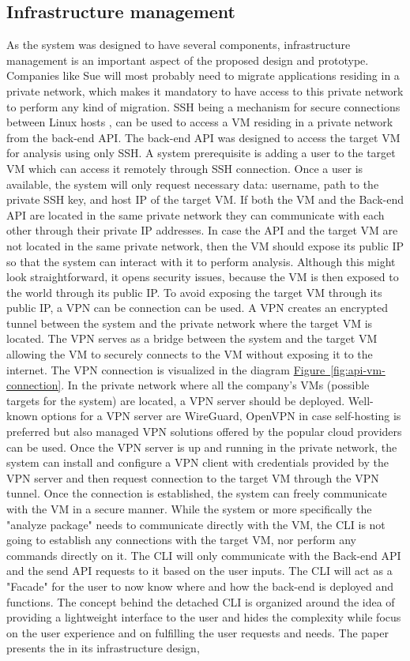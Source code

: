 \documentclass{article}
\newcommand{\FigRef}[1]{\hyperref[#1]{Figure~\ref{#1}}}
\begin{document}
\begin{multicols}{2}
\subsection{Infrastructure management}
As the system was designed to have several components, infrastructure management is an important aspect of the proposed design and prototype. Companies like Sue will most probably need to migrate applications residing in a private network, which makes it mandatory to have access to this private network to perform any kind of migration.
SSH being a mechanism for secure connections between Linux hosts \cite{Both-2023}, can be used to access a VM residing in a private network from the back-end API. The back-end API was designed to access the target VM for analysis using only SSH. A system prerequisite is adding a user to the target VM which can access it remotely through SSH connection. Once a user is available, the system will only request necessary data: username, path to the private SSH key, and host IP of the target VM. If both the VM and the Back-end API are located in the same private network they can communicate with each other through their private IP addresses. In case the API and the target VM are not located in the same private network, then the VM should expose its public IP so that the system can interact with it to perform analysis. Although this might look straightforward, it opens security issues, because the VM is then exposed to the world through its public IP. To avoid exposing the target VM through its public IP, a VPN can be connection can be used. A VPN creates an encrypted tunnel between the system and the private network where the target VM is located. The VPN serves as a bridge between the system and the target VM allowing the VM to securely connects to the VM without exposing it to the internet. The VPN connection is visualized in the diagram \FigRef{fig:api-vm-connection}. In the private network where all the company's VMs (possible targets for the system) are located, a VPN server should be deployed. Well-known options for a VPN server are WireGuard, OpenVPN in case self-hosting is preferred but also managed VPN solutions offered by the popular cloud providers can be used. Once the VPN server is up and running in the private network, the system can install and configure a VPN client with credentials provided by the VPN server and then request connection to the target VM through the VPN tunnel. Once the connection is established, the system can freely communicate with the VM in a secure manner. While the system or more specifically the "analyze package" needs to communicate directly with the VM, the CLI is not going to establish any connections with the target VM, nor perform any commands directly on it. The CLI will only communicate with the Back-end API and the send API requests to it based on the user inputs. The CLI will act as a "Facade" for the user to now know where and how the back-end is deployed and functions. The concept behind the detached CLI is organized around the idea of providing a lightweight interface to the user and hides the complexity while focus on the user experience and on fulfilling the user requests and needs. The paper presents the in its infrastructure design, 
\end{multicols}
\end{document}
